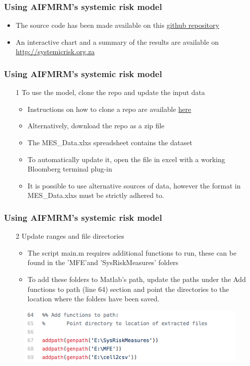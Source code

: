 \documentclass[11pt]{beamer}
\begin{document}
\begin{frame}
\frametitle{Using AIFMRM's systemic risk model}
\begin{itemize}
\item The source code has been made available on this \href{https://github.com/qobolwakhe/SA-systemic-risk}{github repository}
\item An interactive chart and a summary of the results are available on \url{http://systemicrisk.org.za}
\end{itemize}



\end{frame}


\begin{frame}
\frametitle{Using AIFMRM's systemic risk model}
\begin{enumerate}
\item[1] To use the model, clone the repo and update the input data
\begin{itemize}
\item Instructions on how to clone a repo are available \href{https://help.github.com/articles/cloning-a-repository/}{here}
\item Alternatively, download the repo as a zip file
\item The MES\_Data.xlxs spreadsheet contains the dataset
\item To automatically update it, open the file in excel with a working Bloomberg terminal plug-in
\item It is possible to use alternative sources of data, however the format in MES\_Data.xlxs must be strictly adhered to.
\end{itemize}
\end{enumerate}

\end{frame}

\begin{frame}
\frametitle{Using AIFMRM's systemic risk model}
\begin{enumerate}
\item[2] Update ranges and file directories
\begin{itemize}
\item The script main.m requires additional functions to run, these can be found in the 'MFE'and 'SysRiskMeasures' folders
\item To add these folders to Matlab's path, update the paths under the Add functions to path (line 64) section and point the directories to the location where the folders have been saved.
\end{itemize}
\end{enumerate}
\begin{figure}
\centering
\includegraphics[width=3.in]{srisk1.png}
\end{figure}
\end{frame}
\end{document}
